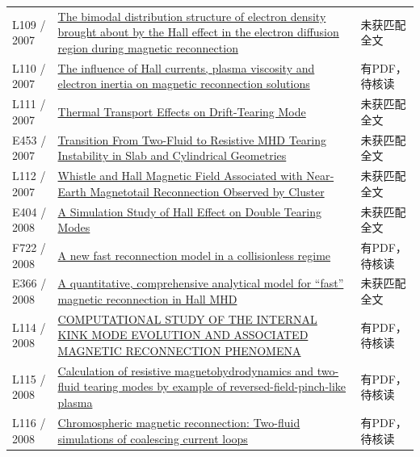 \begin{longtable}{P{24mm}P{97mm}P{27mm}}
L109 / 2007 & \href{https://doi.org/10.1063/1.2741241}{The bimodal distribution structure of electron density brought about by the Hall effect in the electron diffusion region during magnetic reconnection} & 未获匹配全文\\

L110 / 2007 & \href{https://hdl.handle.net/10289/2593}{The influence of Hall currents,  plasma viscosity and electron inertia on magnetic reconnection solutions} & 有PDF，待核读\\

L111 / 2007 & \href{https://doi.org/10.1143/jpsj.76.064501}{Thermal Transport Effects on Drift-Tearing Mode} & 未获匹配全文\\

E453 / 2007 & \href{http://absimage.aps.org/image/DPP07/MWS_DPP07-2007-001398.pdf}{Transition From Two-Fluid to Resistive MHD Tearing Instability in Slab and Cylindrical Geometries} & 未获匹配全文\\

L112 / 2007 & \href{https://doi.org/10.1002/cjg2.1069}{Whistle and Hall Magnetic Field Associated with Near‐Earth Magnetotail Reconnection Observed by Cluster} & 未获匹配全文\\

E404 / 2008 & \href{https://doi.org/10.1088/1009-0630/10/4/02}{A Simulation Study of Hall Effect on Double Tearing Modes} & 未获匹配全文\\

F722 / 2008 & \href{https://doi.org/10.1063/1.3029737}{A new fast reconnection model in a collisionless regime} & 有PDF，待核读\\

E366 / 2008 & \href{http://absimage.aps.org/image/DPP08/MWS_DPP08-2008-000188.pdf}{A quantitative,  comprehensive analytical model for ``fast'' magnetic reconnection in Hall MHD} & 未获匹配全文\\

L114 / 2008 & \href{https://doi.org/10.5281/zenodo.3783590}{COMPUTATIONAL STUDY OF THE INTERNAL KINK MODE EVOLUTION AND ASSOCIATED MAGNETIC RECONNECTION PHENOMENA} & 有PDF，待核读\\

L115 / 2008 & \href{https://doi.org/10.1063/1.2917916}{Calculation of resistive magnetohydrodynamics and two-fluid tearing modes by example of reversed-field-pinch-like plasma} & 有PDF，待核读\\

L116 / 2008 & \href{https://doi.org/10.1051/0004-6361:200809624}{Chromospheric magnetic reconnection: Two-fluid simulations of coalescing current loops} & 有PDF，待核读\\


\end{longtable}
